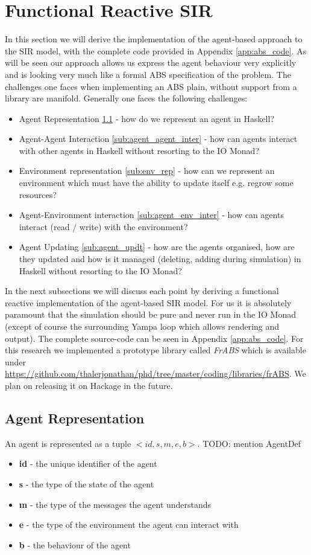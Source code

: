 \section{Functional Reactive SIR}
In this section we will derive the implementation of the agent-based approach to the SIR model, with the complete code provided in Appendix \ref{app:abs_code}. As will be seen our approach allows us express the agent behaviour very explicitly and is looking very much like a formal ABS specification of the problem. The challenges one faces when implementing an ABS plain, without support from a library are manifold. Generally one faces the following challenges:

\begin{itemize}
	\item Agent Representation \ref{sub:agent_rep} - how do we represent an agent in Haskell?
	\item Agent-Agent Interaction \ref{sub:agent_agent_inter} - how can agents interact with other agents in Haskell without resorting to the IO Monad?
	\item Environment representation \ref{sub:env_rep} - how can we represent an environment which must have the ability to update itself e.g. regrow some resources?
	\item Agent-Environment interaction \ref{sub:agent_env_inter} - how can agents interact (read / write) with the environment?
	\item Agent Updating \ref{sub:agent_updt} - how are the agents organised, how are they updated and how is it managed (deleting, adding during simulation) in Haskell without resorting to the IO Monad?
\end{itemize}

In the next subsections we will discuss each point by deriving a functional reactive implementation of the agent-based SIR model. For us it is absolutely paramount that the simulation should be pure and never run in the IO Monad (except of course the surrounding Yampa loop which allows rendering and output). The complete source-code can be seen in Appendix \ref{app:abs_code}. For this research we implemented a prototype library called \textit{FrABS} which is available under \url{https://github.com/thalerjonathan/phd/tree/master/coding/libraries/frABS}. We plan on releasing it on Hackage in the future.

\subsection{Agent Representation}
\label{sub:agent_rep}
An agent is represented as a tuple $<id, s, m, e, b>$. TODO: mention AgentDef
\begin{itemize}
	\item \textbf{id} - the unique identifier of the agent
	\item \textbf{s} - the type of the state of the agent
	\item \textbf{m} - the type of the messages the agent understands
	\item \textbf{e} - the type of the environment the agent can interact with
	\item \textbf{b} - the behaviour of the agent
\end{itemize}

